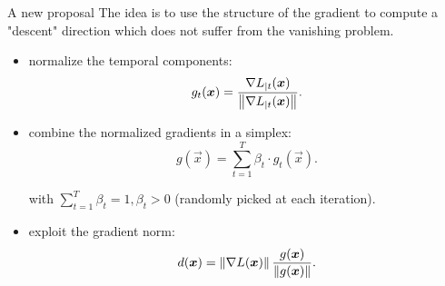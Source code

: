 \begin{frame}{A new proposal}
	The idea is to use the structure of the gradient to compute a "descent" direction which does not suffer from the vanishing problem.
\begin{itemize}
	\item normalize the temporal components:
	\begin{equation}
	g_t(\boldsymbol{x}) = \frac{\nabla L_{|t}(\boldsymbol{x})}{\left\Vert \nabla L_{|t}(\boldsymbol{x}) \right\Vert}.
	\end{equation}
	
	\item combine the normalized gradients in a simplex:
		\begin{equation}
		g(\vec{x}) = \sum_{t=1}^T \beta_t \cdot g_t(\vec{x}).
		\end{equation}
		
		with $\sum_{t=1}^T\beta_t=1, \beta_t>0$ (randomly picked at each iteration).
	\item exploit the gradient norm:
	\begin{equation}
			d(\boldsymbol{x}) = \left\Vert \nabla L (\boldsymbol{x}) \right\Vert\frac{g(\boldsymbol{x})}{\left\Vert g(\boldsymbol{x}) \right\Vert}.
	\end{equation}
\end{itemize}



\end{frame}
